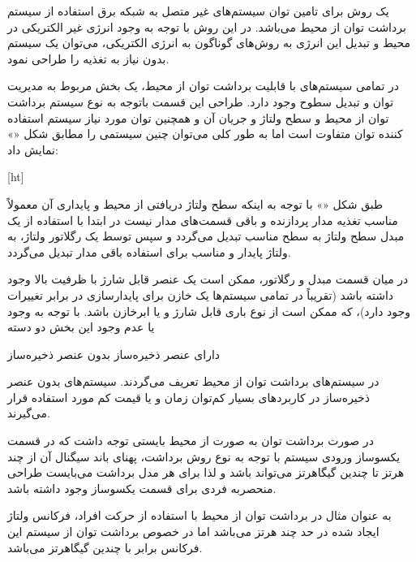 \label{کار‌های پیشین}

یک روش برای تامین توان سیستم‌های  غیر متصل به شبکه برق استفاده از سیستم برداشت توان از محیط می‌باشد. در این روش با توجه به وجود انرژی غیر الکتریکی در محیط و تبدیل این انرژی به روش‌های گوناگون به انرژی الکتریکی، می‌توان یک سیستم  بدون نیاز به تغذیه را طراحی نمود.

در تمامی سیستم‌های با قابلیت برداشت توان از محیط، یک بخش مربوط به مدیریت توان و تبدیل سطوح وجود دارد. طراحی این قسمت باتوجه به نوع سیستم‌ برداشت توان از محیط و سطح ولتاژ و جریان آن و همچنین توان مورد نیاز سیستم استفاده کننده توان متفاوت است اما به طور کلی می‌توان چنین سیستمی را مطابق شکل «» نمایش داد:


[ht]


طبق شکل «» با توجه به اینکه سطح ولتاژ دریافتی از محیط و پایداری آن معمولاً مناسب تغذیه مدار پردازنده و باقی قسمت‌های مدار نیست در ابتدا با استفاده از یک مبدل  سطح ولتاژ به سطح مناسب تبدیل می‌گردد و سپس توسط یک رگلاتور ولتاژ، به ولتاژ پایدار و مناسب برای استفاده باقی مدار تبدیل می‌گردد. 

در میان قسمت مبدل  و رگلاتور، ممکن است یک عنصر قابل شارژ با ظرفیت بالا وجود داشته باشد (تقریباً در تمامی سیستم‌ها یک خازن برای پایدارسازی در برابر تغییرات وجود دارد)، که ممکن است از نوع باری قابل شارژ و یا ابرخازن باشد. با توجه به وجود یا عدم وجود این بخش دو دسته

 دارای عنصر ذخیره‌ساز 
 بدون عنصر ذخیره‌ساز 

در سیستم‌های برداشت توان از محیط تعریف می‌گردند. سیستم‌های بدون عنصر ذخیره‌ساز در کاربردهای بسیار کم‌توان ‌زمان و یا قیمت کم مورد استفاده قرار می‌گیرند.

در صورت برداشت توان به صورت  از محیط بایستی توجه داشت که در قسمت یکسوساز ورودی سیستم با توجه به نوع روش برداشت، پهنای باند سیگنال آن از چند هرتز تا چندین گیگاهرتز می‌تواند باشد و لذا برای هر مدل برداشت می‌بایست طراحی منحصربه فردی برای قسمت یکسوساز وجود داشته باشد. 


به عنوان مثال در برداشت توان از محیط با استفاده از حرکت افراد، فرکانس ولتاژ ایجاد شده در حد چند هرتز می‌باشد اما در خصوص برداشت توان از سیستم  این فرکانس برابر با چندین گیگاهرتز می‌باشد.


